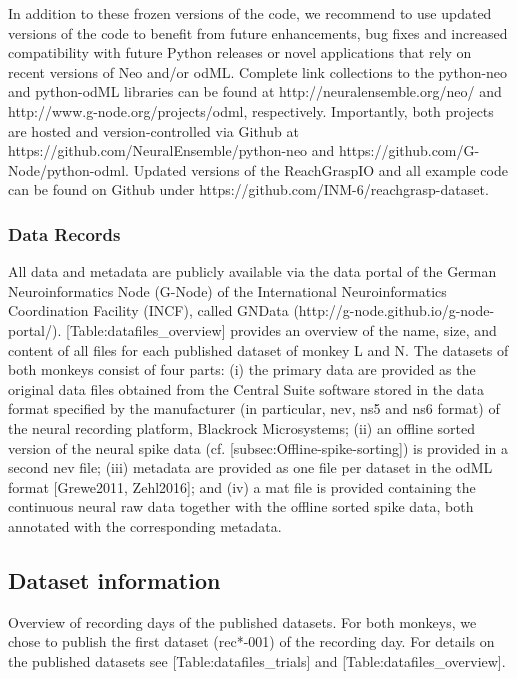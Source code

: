 In addition to these frozen versions of the code, we recommend to use updated versions of the code to benefit from future enhancements, bug fixes and increased compatibility with future Python releases or novel applications that rely on recent versions of Neo and/or odML. Complete link collections to the python-neo and python-odML libraries can be found at http://neuralensemble.org/neo/ and http://www.g-node.org/projects/odml, respectively. Importantly, both projects are hosted and version-controlled via Github at https://github.com/NeuralEnsemble/python-neo and https://github.com/G-Node/python-odml. Updated versions of the ReachGraspIO and all example code can be found on Github under https://github.com/INM-6/reachgrasp-dataset.

\subsubsection{Data Records}

All data and metadata are publicly available via the data portal of the German Neuroinformatics Node (G-Node) of the International Neuroinformatics Coordination Facility (INCF), called GNData (http://g-node.github.io/g-node-portal/). [Table:datafiles\_overview] provides an overview of the name, size, and content of all files for each published dataset of monkey L and N. The datasets of both monkeys consist of four parts: (i) the primary data are provided as the original data files obtained from the Central Suite software stored in the data format specified by the manufacturer (in particular, nev, ns5 and ns6 format) of the neural recording platform, Blackrock Microsystems; (ii) an offline sorted version of the neural spike data (cf. [subsec:Offline-spike-sorting]) is provided in a second nev file; (iii) metadata are provided as one file per dataset in the odML format [Grewe2011, Zehl2016]; and (iv) a mat file is provided containing the continuous neural raw data together with the offline sorted spike data, both annotated with the corresponding metadata.



\subsection{Dataset information}

Overview of recording days of the published datasets. For both monkeys, we chose to publish the first dataset (rec*-001) of the recording day. For details on the published datasets see [Table:datafiles\_trials] and [Table:datafiles\_overview].

